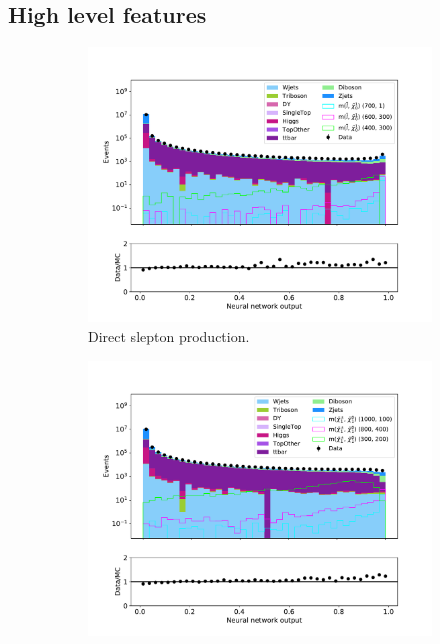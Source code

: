 \subsection{High level features}

\begin{figure}[H]
    \centering
    \begin{subfigure}[t!]{0.49\textwidth}
        \includegraphics[width = \textwidth]{Figures/Stacked/stackedplot_NN_High_level_slepslep.pdf}
        \caption{Direct slepton production.}
        \label{fig:}
    \end{subfigure}
    \begin{subfigure}[t!]{0.49\textwidth}
        \includegraphics[width = \textwidth]{Figures/Stacked/stackedplot_NN_High_level_slepsnu.pdf}

\end{subfigure}
\end{figure}
